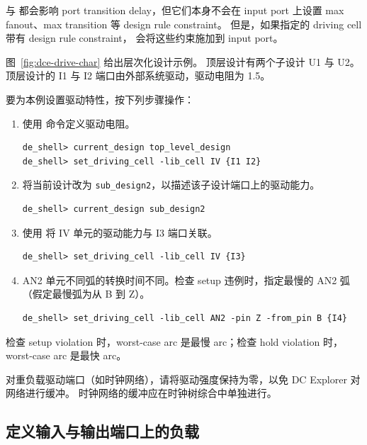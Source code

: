  与  都会影响 port transition delay，但它们本身不会在 input port 上设置 max fanout、max transition 等 design rule constraint。
但是，如果指定的 driving cell 带有 design rule constraint， 会将这些约束施加到 input port。

图~\ref{fig:dce-drive-char} 给出层次化设计示例。
顶层设计有两个子设计 U1 与 U2。
顶层设计的 I1 与 I2 端口由外部系统驱动，驱动电阻为 1.5。


要为本例设置驱动特性，按下列步骤操作：
\begin{enumerate}
  \item 使用  命令定义驱动电阻。
\begin{lstlisting}
de_shell> current_design top_level_design
de_shell> set_driving_cell -lib_cell IV {I1 I2}
\end{lstlisting}
  \item 将当前设计改为 \texttt{sub\_design2}，以描述该子设计端口上的驱动能力。
\begin{lstlisting}
de_shell> current_design sub_design2
\end{lstlisting}
  \item 使用  将 IV 单元的驱动能力与 I3 端口关联。
\begin{lstlisting}
de_shell> set_driving_cell -lib_cell IV {I3}
\end{lstlisting}
  \item AN2 单元不同弧的转换时间不同。检查 setup 违例时，指定最慢的 AN2 弧（假定最慢弧为从 B 到 Z）。
\begin{lstlisting}
de_shell> set_driving_cell -lib_cell AN2 -pin Z -from_pin B {I4}
\end{lstlisting}
\end{enumerate}

检查 setup violation 时，worst-case arc 是最慢 arc；检查 hold violation 时，worst-case arc 是最快 arc。

\begin{noteBox}
对重负载驱动端口（如时钟网络），请将驱动强度保持为零，以免 DC Explorer 对网络进行缓冲。
时钟网络的缓冲应在时钟树综合中单独进行。
\end{noteBox}

\subsection{定义输入与输出端口上的负载}
